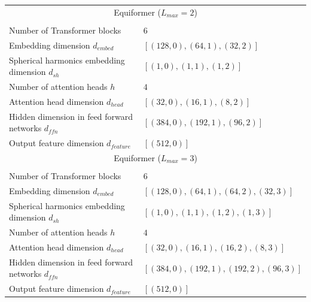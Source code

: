\begin{table}[]
{\begin{tabular}{ll}
\midrule[0.6pt]

\multicolumn{2}{c}{Equiformer ($L_{max} = 2$)} \\
\\
Number of Transformer blocks & $6$ \\
Embedding dimension $d_{embed}$ & $[(128, 0), (64, 1), (32, 2)]$ \\
Spherical harmonics embedding dimension $d_{sh}$ & $[(1, 0), (1, 1), (1, 2)]$ \\
Number of attention heads $h$ & $4$ \\
Attention head dimension $d_{head}$ & $[(32, 0), (16, 1), (8, 2)]$\\
Hidden dimension in feed forward networks $d_{ffn}$ & $[(384, 0), (192, 1) , (96, 2)]$ \\
Output feature dimension $d_{feature}$ & $[(512, 0)]$\\

\midrule[0.6pt]

\multicolumn{2}{c}{Equiformer ($L_{max} = 3$)} \\
\\
Number of Transformer blocks & $6$ \\
Embedding dimension $d_{embed}$ & $[(128, 0), (64, 1), (64, 2), (32, 3)]$ \\
Spherical harmonics embedding dimension $d_{sh}$ & $[(1, 0), (1, 1), (1, 2), (1, 3)]$ \\
Number of attention heads $h$ & $4$ \\
Attention head dimension $d_{head}$ & $[(32, 0), (16, 1), (16, 2), (8, 3)]$\\
Hidden dimension in feed forward networks $d_{ffn}$ & $[(384, 0), (192, 1), (192, 2), (96, 3)]$ \\
Output feature dimension $d_{feature}$ & $[(512, 0)]$\\



\end{tabular}}
\end{table}

